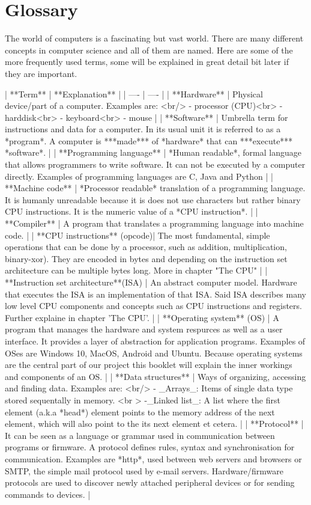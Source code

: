 \section{Glossary}
The world of computers is a fascinating but vast world. There are many different concepts in computer science and all of them are named.
Here are some of the more frequently used terms, some will be explained in great detail bit later if they are important.

| **Term** | **Explanation** |
| ---- | ---- |
| **Hardware** | Physical device/part of a computer. Examples are: <br/> - processor (CPU)<br> - harddisk<br> - keyboard<br> - mouse |
| **Software** | Umbrella term for instructions and data for a computer. In its usual unit it is referred to as a *program*. A computer is ***made*** of *hardware* that can ***execute*** *software*. |
| **Programming language** | *Human readable*, formal language that allows programmers to write software. It can not be executed by a computer directly. Examples of programming languages are C, Java and Python |
| **Machine code** | *Processor readable* translation of a programming language. It is humanly unreadable because it is does not use characters but rather binary CPU instructions. It is the numeric value of a *CPU instruction*. |
| **Compiler** | A program that translates a programming language into machine code. |
| **CPU instructions** (opcode)| The most fundamental, simple operations that can be done by a processor, such as addition, multiplication, binary-xor). They are encoded in bytes and depending on the instruction set architecture can be multiple bytes long. More in chapter "The CPU" |
| **Instruction set architecture**(ISA) | An abstract computer model. Hardware that executes the ISA is an implementation of that ISA. Said ISA describes many low level CPU components and concepts such as CPU instructions and registers. Further explaine in chapter 'The CPU'. |
| **Operating system** (OS) | A program that manages the hardware and system respurces as well as a user interface. It provides a layer of abstraction for application programs. Examples of OSes are Windows 10, MacOS, Android and Ubuntu. Because operating systems are the central part of our project this booklet will explain the inner workings and components of an OS. |
| **Data structures** | Ways of organizing, accessing and finding data. Examples are: <br/> - _Arrays_: Items of single data type stored sequentally in memory. <br > -_Linked list_: A list where the first element (a.k.a *head*) element points to the memory address of the next element, which will also point to the its next element et cetera. |
| **Protocol** | It can be seen as a language or grammar used in communication between programs or firmware. A protocol defines rules, syntax and synchronisation for communication. Examples are *http*, used between web servers and browsers or SMTP, the simple mail protocol used by e-mail servers. Hardware/firmware protocols are used to discover newly attached peripheral devices or for sending commands to devices. |


